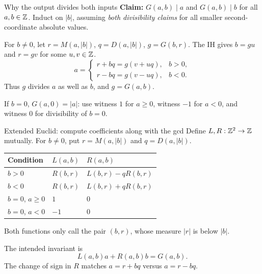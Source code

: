 \begin{frame}{Why the output divides both inputs}
\textbf{Claim:} $G(a,b)\mid a$ and $G(a,b)\mid b$ for all $a,b\in\mathbb{Z}$.
Induct on $|b|$, assuming \emph{both divisibility claims} for all smaller
second-coordinate absolute values.

For $b\ne0$, let $r=M(a,|b|)$, $q=D(a,|b|)$, $g=G(b,r)$.
The IH gives $b=gu$ and $r=gv$ for some $u,v\in\mathbb{Z}$.
\[
 a=\begin{cases}
 r+bq=g(v+uq),&b>0,\\
 r-bq=g(v-uq),&b<0.
 \end{cases}
\]
Thus $g$ divides $a$ as well as $b$, and $g=G(a,b)$.

If $b=0$, $G(a,0)=|a|$: use witness $1$ for $a\ge0$, witness $-1$
for $a<0$, and witness $0$ for divisibility of $b=0$.
\end{frame}

\begin{frame}{Extended Euclid: compute coefficients along with the gcd}
Define $L,R:\mathbb{Z}^2\to\mathbb{Z}$ mutually. For $b\ne0$, put
$r=M(a,|b|)$ and $q=D(a,|b|)$.
\begin{center}
\begin{tabular}{lll}
\toprule
Condition & $L(a,b)$ & $R(a,b)$\\
\midrule
$b>0$ & $R(b,r)$ & $L(b,r)-qR(b,r)$\\
$b<0$ & $R(b,r)$ & $L(b,r)+qR(b,r)$\\
$b=0$, $a\ge0$ & $1$ & $0$\\
$b=0$, $a<0$ & $-1$ & $0$\\
\bottomrule
\end{tabular}
\end{center}
Both functions only call the pair $(b,r)$, whose measure $|r|$ is below $|b|$.

The intended invariant is
\[
 L(a,b)a+R(a,b)b=G(a,b).
\]
The change of sign in $R$ matches $a=r+bq$ versus $a=r-bq$.
\end{frame}

